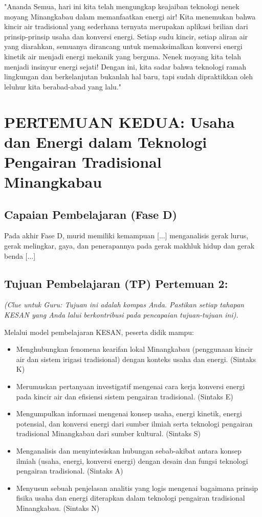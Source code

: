\documentclass[12pt,a4paper]{article}
\begin{document}
"Ananda Semua, hari ini kita telah mengungkap keajaiban teknologi nenek moyang Minangkabau dalam memanfaatkan energi air! Kita menemukan bahwa kincir air tradisional yang sederhana ternyata merupakan aplikasi brilian dari prinsip-prinsip usaha dan konversi energi. Setiap sudu kincir, setiap aliran air yang diarahkan, semuanya dirancang untuk memaksimalkan konversi energi kinetik air menjadi energi mekanik yang berguna. Nenek moyang kita telah menjadi insinyur energi sejati! Dengan ini, kita sadar bahwa teknologi ramah lingkungan dan berkelanjutan bukanlah hal baru, tapi sudah dipraktikkan oleh leluhur kita berabad-abad yang lalu."

\section{PERTEMUAN KEDUA: Usaha dan Energi dalam Teknologi Pengairan Tradisional Minangkabau}

\subsection{Capaian Pembelajaran (Fase D)}
Pada akhir Fase D, murid memiliki kemampuan [...] menganalisis gerak lurus, gerak melingkar, gaya, dan penerapannya pada gerak makhluk hidup dan gerak benda [...]

\subsection{Tujuan Pembelajaran (TP) Pertemuan 2:}
\textit{(Clue untuk Guru: Tujuan ini adalah kompas Anda. Pastikan setiap tahapan KESAN yang Anda lalui berkontribusi pada pencapaian tujuan-tujuan ini).}

Melalui model pembelajaran KESAN, peserta didik mampu:
\begin{itemize}
\item Menghubungkan fenomena kearifan lokal Minangkabau (penggunaan kincir air dan sistem irigasi tradisional) dengan konteks usaha dan energi. (Sintaks K)
\item Merumuskan pertanyaan investigatif mengenai cara kerja konversi energi pada kincir air dan efisiensi sistem pengairan tradisional. (Sintaks E)
\item Mengumpulkan informasi mengenai konsep usaha, energi kinetik, energi potensial, dan konversi energi dari sumber ilmiah serta teknologi pengairan tradisional Minangkabau dari sumber kultural. (Sintaks S)
\item Menganalisis dan menyintesiskan hubungan sebab-akibat antara konsep ilmiah (usaha, energi, konversi energi) dengan desain dan fungsi teknologi pengairan tradisional. (Sintaks A)
\item Menyusun sebuah penjelasan analitis yang logis mengenai bagaimana prinsip fisika usaha dan energi diterapkan dalam teknologi pengairan tradisional Minangkabau. (Sintaks N)
\end{itemize}
\end{document}
